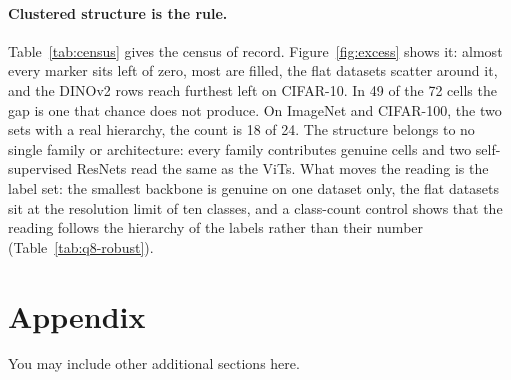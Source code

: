 \documentclass{article} %
\begin{document}
\paragraph{Clustered structure is the rule.} Table~\ref{tab:census} gives the census of record. Figure~\ref{fig:excess} shows it: almost every marker sits left of zero, most are filled, the flat datasets scatter around it, and the DINOv2 rows reach furthest left on CIFAR-10. In 49 of the 72 cells the gap is one that chance does not produce. On ImageNet and CIFAR-100, the two sets with a real hierarchy, the count is 18 of 24. The structure belongs to no single family or architecture: every family contributes genuine cells and two self-supervised ResNets read the same as the ViTs. What moves the reading is the label set: the smallest backbone is genuine on one dataset only, the flat datasets sit at the resolution limit of ten classes, and a class-count control shows that the reading follows the hierarchy of the labels rather than their number (Table~\ref{tab:q8-robust}). %





\appendix
\section{Appendix}
You may include other additional sections here.
\end{document}
